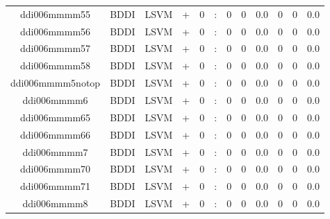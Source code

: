 \documentclass[a4paper]{article}
\begin{document}
\begin{landscape}
\begin{center}
\begin{tabular}{ |c|c|c|c|c|c|c|c|c|c|c|c|}
 
 	
 	\small{ ddi006mmmm55 } & BDDI & LSVM & +  &  0 &  :  &  0 & 0 & 0.0  &  0 & 0 & 0.0 \\
 	

 
 	
 	\small{ ddi006mmmm56 } & BDDI & LSVM & +  &  0 &  :  &  0 & 0 & 0.0  &  0 & 0 & 0.0 \\
 	

 
 	
 	\small{ ddi006mmmm57 } & BDDI & LSVM & +  &  0 &  :  &  0 & 0 & 0.0  &  0 & 0 & 0.0 \\
 	

 
 	
 	\small{ ddi006mmmm58 } & BDDI & LSVM & +  &  0 &  :  &  0 & 0 & 0.0  &  0 & 0 & 0.0 \\
 	

 
 	
 	\small{ ddi006mmmm5notop } & BDDI & LSVM & +  &  0 &  :  &  0 & 0 & 0.0  &  0 & 0 & 0.0 \\
 	

 
 	
 	\small{ ddi006mmmm6 } & BDDI & LSVM & +  &  0 &  :  &  0 & 0 & 0.0  &  0 & 0 & 0.0 \\
 	

 
 	
 	\small{ ddi006mmmm65 } & BDDI & LSVM & +  &  0 &  :  &  0 & 0 & 0.0  &  0 & 0 & 0.0 \\
 	

 
 	
 	\small{ ddi006mmmm66 } & BDDI & LSVM & +  &  0 &  :  &  0 & 0 & 0.0  &  0 & 0 & 0.0 \\
 	

 
 	
 	\small{ ddi006mmmm7 } & BDDI & LSVM & +  &  0 &  :  &  0 & 0 & 0.0  &  0 & 0 & 0.0 \\
 	

 
 	
 	\small{ ddi006mmmm70 } & BDDI & LSVM & +  &  0 &  :  &  0 & 0 & 0.0  &  0 & 0 & 0.0 \\
 	

 
 	
 	\small{ ddi006mmmm71 } & BDDI & LSVM & +  &  0 &  :  &  0 & 0 & 0.0  &  0 & 0 & 0.0 \\
 	

 
 	
 	\small{ ddi006mmmm8 } & BDDI & LSVM & +  &  0 &  :  &  0 & 0 & 0.0  &  0 & 0 & 0.0 \\
 	


\end{tabular}
\end{center}
\end{landscape}
\end{document}
